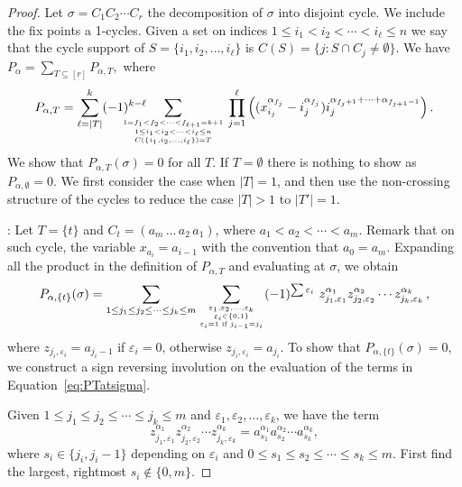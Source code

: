 \documentclass[12pt]{amsart}
\theoremstyle{definition}
\theoremstyle{remark}
\numberwithin{equation}{section}
\renewcommand{\epsilon}{\varepsilon}
\begin{document}
\begin{proof}
 Let $\sigma=C_1C_2\cdots C_r$  the decomposition of $\sigma$ into disjoint cycle. We include the fix points a 1-cycles.
 Given a set on indices $1\le i_1<i_2<\cdots < i_\ell\le n$ we say that the cycle support of $S=\{ i_1,i_2,\ldots , i_\ell\}$
 is $C(S)=\{j : S\cap C_j \not= \emptyset \}$. We have
 	$\displaystyle P_\alpha=\sum_{T\subseteq [r]} P_{\alpha,T},$
where 
\begin{equation}\label{eq:PT}
P_{\alpha,T}=
	\sum_{\ell=|T|}^k (-1)^{k-\ell} \hskip-.8cm \sum_{{1=f_1<f_2<\cdots <f_{\ell+1}=k+1  \atop 1\le i_1<i_2<\cdots < i_\ell\le n}\atop C(\{ i_1,i_2,\ldots , i_\ell\})=T} \prod_{j=1}^\ell 
	      \Big( (x_{i_j}^{\alpha_{f_j}}- i_j^{\alpha_{f_j }})  i_j^{\alpha_{f_j +1}+\cdots+\alpha_{f_{j +1}-1}} \Big)\,.
\end{equation}
We show that $P_{\alpha,T}(\sigma)=0$ for all $T$. If $T=\emptyset$ there is nothing to show as $P_{\alpha,\emptyset}=0$. 
We first consider the case when $|T|=1$, and then use the non-crossing structure of the cycles to reduce the case $|T|>1$
to $|T'|=1$.

\medskip
{}: Let $T=\{t\}$ and $C_t=(a_m\,\ldots\,a_2\,a_1)$, where $a_1<a_2<\cdots<a_m$. Remark that on such cycle, the variable $x_{a_i}=a_{i-1}$ with the convention that $a_0=a_m$.
Expanding all the product in the definition of $P_{\alpha,T}$ and evaluating at $\sigma$, we obtain
\begin{equation}\label{eq:PTatsigma}
	P_{\alpha,\{t\}}(\sigma)=
	\sum_{{1\le j_1\le j_2\le\cdots\le j_k\le m}} \sum_{{\epsilon_1,\epsilon_2,\ldots,\epsilon_k \atop \epsilon_i\in \{0,1\}}\atop \epsilon_i=1 \text{ if } j_{i-1}=j_i} (-1)^{\sum \epsilon_i}\ 
	   z_{j_1,\epsilon_1}^{\alpha_1}z_{j_2,\epsilon_2}^{\alpha_2} \cdots z_{j_k,\epsilon_k}^{\alpha_k}\,,
\end{equation}
where $z_{j_i,\epsilon_i}=a_{j_i-1}$ if $\epsilon_i=0$, otherwise $z_{j_i,\epsilon_i}=a_{j_i}$. To show that $P_{\alpha,\{t\}}(\sigma)=0$, we construct a sign reversing involution 
on the evaluation of the terms in Equation~\eqref{eq:PTatsigma}.

Given $1\le j_1\le j_2\le\cdots\le j_k\le m$ and $\epsilon_1,\epsilon_2,\ldots,\epsilon_k$, we have the term 
$$z_{j_1,\epsilon_1}^{\alpha_1}z_{j_2,\epsilon_2}^{\alpha_2} \cdots z_{j_k,\epsilon_k}^{\alpha_k}=a_{s_1}^{\alpha_1}a_{s_2}^{\alpha_2}\cdots a_{s_k}^{\alpha_k},$$
where $s_i\in\{j_i,j_i-1\}$ depending on  $\epsilon_i$ and  $0\le s_1\le s_2\le \cdots\le s_k\le m$. First find the largest, rightmost $s_i\not\in\{0,m\}$. 


\end{proof}
\end{document}
